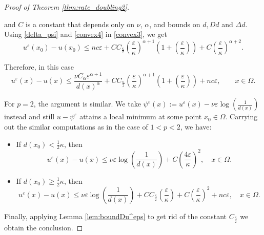 \documentclass[12pt,reqno]{amsart}
\numberwithin{figure}{section}
\theoremstyle{plain}
\theoremstyle{remark}
\numberwithin{equation}{section}
\begin{document}
\begin{proof}[Proof of Theorem \ref{thm:rate_doubling2}]
\begin{itemize}
and $C$ is a constant that depends only on $\nu$, $\alpha$, and bounds on $d,Dd$ and $\Delta d$. Using \eqref{delta_psi} and \eqref{convex4} in \eqref{convex3}, we get
\begin{equation*}
    u^\varepsilon(x_0) - u(x_0) \leq nc\varepsilon + CC_\frac{\kappa}{2} \left(\frac{\varepsilon}{\kappa}\right)^{\alpha+1}\left(1+ \left(\frac{\varepsilon}{\kappa}\right)\right) + C\left(\frac{\varepsilon}{\kappa}\right)^{\alpha+2}.
\end{equation*}

Therefore, in this case 
\begin{equation*}
    u^\varepsilon(x) - u(x) \leq \frac{\nu C_\alpha \varepsilon^{\alpha+1}}{d(x)^\alpha} + CC_\frac{\kappa}{2} \left(\frac{\varepsilon}{\kappa}\right)^{\alpha+1}\left(1+ \left(\frac{\varepsilon}{\kappa}\right)\right) + nc\varepsilon, \qquad x\in \Omega.
\end{equation*}
\end{itemize}

For $p = 2$, the argument is similar. We take $\psi^\varepsilon(x):=u^\varepsilon(x)-\nu \varepsilon \log \left(\frac{1}{d(x)}\right)$ instead and still $u-\psi^\varepsilon$ attains a local minimum at some point $x_0 \in \Omega$. Carrying out the similar computations as in the case of $1 < p < 2$, we have:
\begin{itemize}
    \item If $\displaystyle d(x_0) < \frac{1}{2} \kappa$, then
    \begin{equation*}
        u^\varepsilon(x)-u(x) \leq \nu \varepsilon \log \left( \frac{1}{d(x)} \right) + C\left( \frac{4\varepsilon}{\kappa}\right)^2, \quad x \in \Omega.
    \end{equation*}
    \item If $\displaystyle d(x_0) \geq \frac{1}{2} \kappa$, then
    \begin{equation*}
        u^\varepsilon(x)-u(x) \leq \nu \varepsilon \log\left(\frac{1}{d(x)}\right) + 
        C C_\frac{\kappa}{2} \left( \frac{\varepsilon}{\kappa} \right) + C \left( \frac{\varepsilon}{\kappa} \right)^2 + nc\varepsilon, \quad x \in \Omega.
    \end{equation*}
\end{itemize}
Finally, applying Lemma \ref{lem:boundDu^eps} to get rid of the constant $C_{\frac{\kappa}{2}}$ we obtain the conclusion.
\end{proof}
\end{document}
